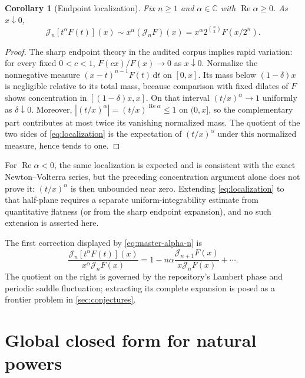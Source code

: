 \documentclass[11pt,oneside]{article}
\newtheorem{corollary}[theorem]{Corollary}
\theoremstyle{definition}
\theoremstyle{remark}
\newcommand{\C}{\mathbb C}
\newcommand{\dd}{\,\mathrm d}
\newcommand{\Jn}{\mathcal J}
\newcommand{\1}{\mathbf 1}
\DeclareMathOperator{\Rea}{Re}
\begin{document}
\begin{corollary}[Endpoint localization]\label{cor:endpoint-localization}
Fix \(n\geq1\) and \(\alpha\in\C\) with \(\Rea\alpha\geq0\).  As
\(x\downarrow0\),
\begin{equation}
 \Jn_n[t^\alpha F(t)](x)
 \sim x^\alpha(\Jn_nF)(x)
 =x^\alpha2^{\binom n2}F(x/2^n).                               \label{eq:localization}
\end{equation}
\end{corollary}

\begin{proof}
The sharp endpoint theory in the audited corpus implies rapid variation:
for every fixed \(0<c<1\), \(F(cx)/F(x)\to0\) as \(x\downarrow0\).  Normalize
the nonnegative measure
\((x-t)^{n-1}F(t)\dd t\) on \([0,x]\).  Its mass below \((1-\delta)x\) is
negligible relative to its total mass, because comparison with fixed dilates
of \(F\) shows concentration in \([(1-\delta)x,x]\).  On that interval
\((t/x)^\alpha\to1\) uniformly as \(\delta\downarrow0\).  Moreover,
\(|(t/x)^\alpha|=(t/x)^{\Rea\alpha}\leq1\) on \((0,x]\), so the complementary
part contributes at most twice its vanishing normalized mass.  The quotient of
the two sides of \eqref{eq:localization} is the expectation of
\((t/x)^\alpha\) under this normalized measure, hence tends to one.
\end{proof}

For \(\Rea\alpha<0\), the same localization is expected and is consistent
with the exact Newton--Volterra series, but the preceding concentration
argument alone does not prove it: \((t/x)^\alpha\) is then unbounded near
zero.  Extending \eqref{eq:localization} to that half-plane requires a separate
uniform-integrability estimate from quantitative flatness (or from the sharp
endpoint expansion), and no such extension is asserted here.

The first correction displayed by \eqref{eq:master-alpha-n} is
\begin{equation}
 \frac{\Jn_n[t^\alpha F(t)](x)}{x^\alpha\Jn_nF(x)}
 =1-n\alpha\frac{\Jn_{n+1}F(x)}{x\Jn_nF(x)}+\cdots.             \label{eq:first-local-correction}
\end{equation}
The quotient on the right is governed by the repository's Lambert phase and
periodic saddle fluctuation; extracting its complete expansion is posed as a
frontier problem in \cref{sec:conjectures}.

\section{Global closed form for natural powers}
\end{document}

